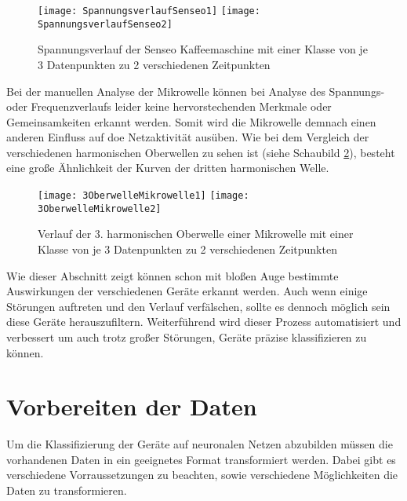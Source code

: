     \begin{figure}[H]
        \centering
        \texttt{[image: SpannungsverlaufSenseo1]}
        \texttt{[image: SpannungsverlaufSenseo2]}
        \caption{Spannungsverlauf der Senseo Kaffeemaschine mit einer Klasse von je 3 Datenpunkten zu 2 verschiedenen Zeitpunkten}
        \label{fig:SpannungsverlaufSenseo}
    \end{figure}

    \noindent
    Bei der manuellen Analyse der Mikrowelle können bei Analyse des Spannungs- oder Frequenzverlaufs leider keine hervorstechenden Merkmale oder Gemeinsamkeiten erkannt werden.
    Somit wird die Mikrowelle demnach einen anderen Einfluss auf doe Netzaktivität ausüben.
    Wie bei dem Vergleich der verschiedenen harmonischen Oberwellen zu sehen ist (siehe Schaubild \ref{fig:3OberwelleMikrowelle}), besteht eine große Ähnlichkeit der Kurven der dritten harmonischen Welle.\\
    \newline

    \begin{figure}[H]
        \centering
        \texttt{[image: 3OberwelleMikrowelle1]}
        \texttt{[image: 3OberwelleMikrowelle2]}
        \caption{Verlauf der 3. harmonischen Oberwelle einer Mikrowelle mit einer Klasse von je 3 Datenpunkten zu 2 verschiedenen Zeitpunkten}
        \label{fig:3OberwelleMikrowelle}
    \end{figure}

    \noindent
    Wie dieser Abschnitt zeigt können schon mit bloßen Auge bestimmte Auswirkungen der verschiedenen Geräte erkannt werden.
    Auch wenn einige Störungen auftreten und den Verlauf verfälschen, sollte es dennoch möglich sein diese Geräte herauszufiltern.
    Weiterführend wird dieser Prozess automatisiert und verbessert um auch trotz großer Störungen, Geräte präzise klassifizieren zu können. 

\section{Vorbereiten der Daten}\label{VorbereitenDerDaten}
    Um die Klassifizierung der Geräte auf neuronalen Netzen abzubilden müssen die vorhandenen Daten in ein geeignetes Format transformiert werden.
    Dabei gibt es verschiedene Vorraussetzungen zu beachten, sowie verschiedene Möglichkeiten die Daten zu transformieren.\\
    
